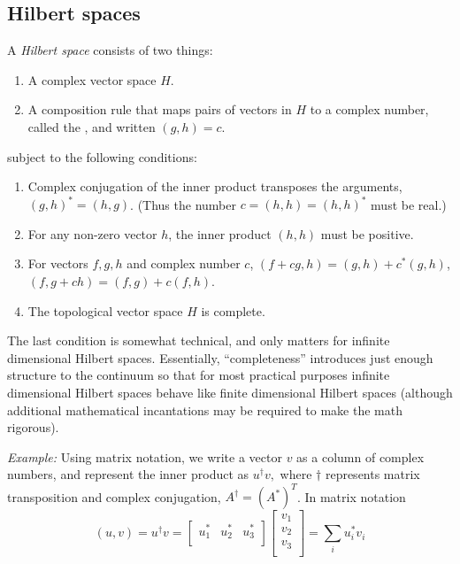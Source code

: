 \subsection{Hilbert spaces}

A {\sl Hilbert space} consists of two things:

 \begin{enumerate}
 \item A complex vector space $H$.
 \item A composition rule that maps pairs of vectors in $H$ to a complex number, called the , and written $(g,h)=c$.
 \end{enumerate}
 subject to the following conditions:
 \begin{enumerate}
 \item Complex conjugation of the inner product transposes the arguments, $(g, h)^* = (h, g)$. (Thus the number $c=(h,h)=(h,h)^*$ must be real.)
 \item For any non-zero vector $h$, the inner product $(h,h)$ must be positive. 
 \item For vectors $f,g,h$ and complex number $c$, $(f+cg,h) = (g,h)+ c^*(g,h)$, $(f, g+ch) = (f,g)+ c(f,h)$.
 \item The topological vector space $H$ is complete.
 \end{enumerate}
The last condition is somewhat technical, and only matters for infinite dimensional Hilbert spaces. Essentially, ``completeness'' introduces just enough structure to the continuum so that for most practical purposes infinite dimensional Hilbert spaces behave like finite dimensional Hilbert spaces (although additional mathematical incantations may be required to make the math rigorous).

{\sl Example:} Using matrix notation, we write a vector $v$ as a column of complex numbers, and represent the inner product as $u^\dagger v,$ where $\dagger$ represents  matrix transposition and complex conjugation, $A^{\dagger} = (A^*)^T$. In matrix notation
\[
(u, v) = 
u^\dagger v = 
\begin{bmatrix}
u^*_1 & u^*_2 & u^*_3\\
\end{bmatrix}
\begin{bmatrix}
v_1 \\ v_2 \\ v_3\\
\end{bmatrix}
= \sum_i u^*_i v_i
\]

